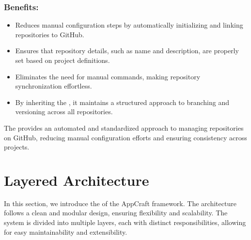 \documentclass[letterpaper,10pt,english]{sphinxhowto}
\begin{document}
\subsubsection{Benefits:}
\label{\detokenize{templates/github/index:benefits}}\begin{itemize}
\item {} 
\sphinxAtStartPar
{}
Reduces manual configuration steps by automatically initializing and linking repositories to GitHub.

\item {} 
\sphinxAtStartPar
{}
Ensures that repository details, such as name and description, are properly set based on project definitions.

\item {} 
\sphinxAtStartPar
{}
Eliminates the need for manual  commands, making repository synchronization effortless.

\item {} 
\sphinxAtStartPar
{}
By inheriting the , it maintains a structured approach to branching and versioning across all repositories.

\end{itemize}

\sphinxAtStartPar
The  provides an automated and standardized approach to managing repositories on GitHub, reducing manual configuration efforts and ensuring consistency across projects. 🚀

\sphinxstepscope


\section{Layered Architecture}
\label{\detokenize{architecture/index:layered-architecture}}\label{\detokenize{architecture/index::doc}}
\sphinxAtStartPar
In this section, we introduce the  of the AppCraft framework. The architecture follows a clean and modular design, ensuring flexibility and scalability. The system is divided into multiple layers, each with distinct responsibilities, allowing for easy maintainability and extensibility.
\end{document}
